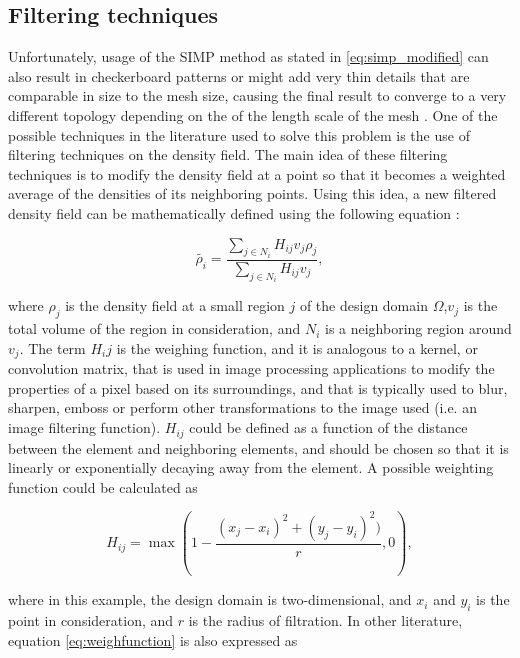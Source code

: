 \documentclass[../main.tex]{subfiles}
\begin{document}
\subsection{Filtering techniques}

Unfortunately, usage of the SIMP method as stated in \ref{eq:simp_modified} can also result in checkerboard patterns or might add very thin details that are comparable in size to the mesh size, causing the final result to converge to a very different topology depending on the of the length scale of the mesh \cite{wangProjectionMethodsConvergence2011a}. One of the possible techniques in the literature used to solve this problem is the use of filtering techniques on the density field. The main idea of these filtering techniques is to modify the density field at a point so that it becomes a weighted average of the densities of its neighboring points. Using this idea, a new filtered density field can be mathematically defined using the following equation \cite{liuEfficient3DTopology2014}:

\begin{equation}
  \tilde{\rho_i} = \frac{\sum_{j \in N_i} H_{ij} v_j \rho_j} {\sum_{j \in N_i} H_{ij} v_j},
\end{equation}

where $\rho_j$ is the density field at a small region $j$ of the design domain $\Omega$,$v_j$ is the total volume of the region in consideration, and $N_i$ is a neighboring region around $v_j$. The term $H_ij$ is the weighing function, and it is analogous to a kernel, or convolution matrix, that is used in image processing applications to modify the properties of a pixel based on its surroundings, and that is typically used to blur, sharpen, emboss or perform other transformations to the image used (i.e. an image filtering function). $H_{ij}$ could be defined as a function of the distance between the element and neighboring elements, and should be chosen so that it is linearly or exponentially decaying away from the element. A possible weighting function could be calculated as 

\begin{equation}
  H_{ij} = \max(1 - \frac{(x_j - x_i)^2 + (y_j - y_i)^2)}{r}, 0),
  \label{eq:weighfunction}
\end{equation}

where in this example, the design domain is two-dimensional, and $x_i$ and $y_i$ is the point in consideration, and $r$ is the radius of filtration. In other literature, equation \ref{eq:weighfunction} is also expressed as \cite{liuEfficient3DTopology2014} 
\end{document}

